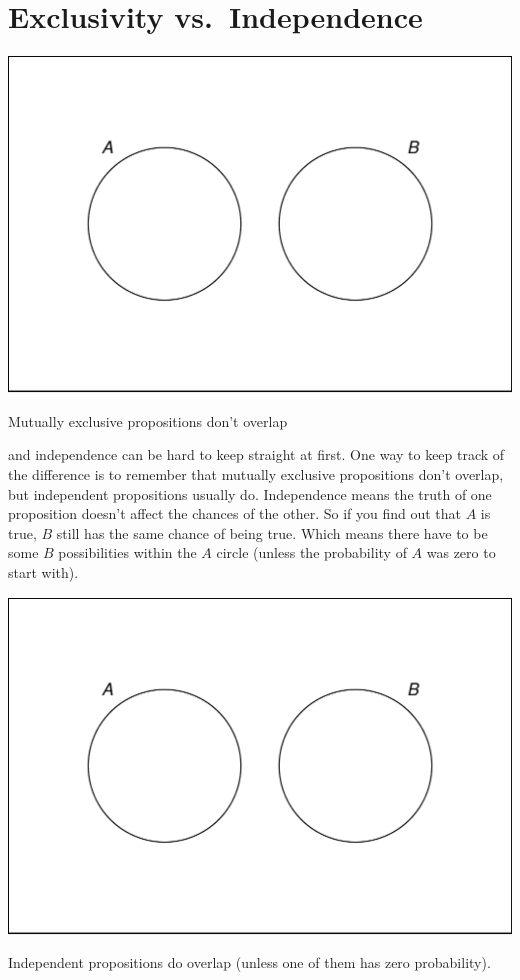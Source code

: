 \documentclass[justified]{tufte-book}
\theoremstyle{definition}
\theoremstyle{definition}
\theoremstyle{definition}
\theoremstyle{remark}
\begin{document}
\hypertarget{exclusivity-vs.independence}{%
\section{Exclusivity
vs.~Independence}\label{exclusivity-vs.independence}}

\begin{marginfigure}
\includegraphics{_main_files/figure-latex/unnamed-chunk-53-1} \caption[Mutually exclusive propositions don't overlap]{Mutually exclusive propositions don't overlap}\label{fig:unnamed-chunk-53}
\end{marginfigure}

 and independence can be hard to keep straight
at first. One way to keep track of the difference is to remember that
mutually exclusive propositions don't overlap, but independent
propositions usually do. Independence means the truth of one proposition
doesn't affect the chances of the other. So if you find out that \(A\)
is true, \(B\) still has the same chance of being true. Which means
there have to be some \(B\) possibilities within the \(A\) circle
(unless the probability of \(A\) was zero to start with).

\begin{marginfigure}
\includegraphics{_main_files/figure-latex/unnamed-chunk-54-1} \caption[Independent propositions do overlap (unless one of them has zero probability)]{Independent propositions do overlap (unless one of them has zero probability).}\label{fig:unnamed-chunk-54}
\end{marginfigure}
\end{document}
